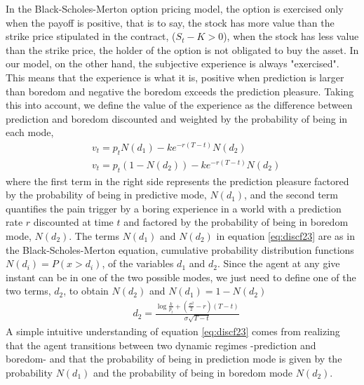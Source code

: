 \documentclass[11pt, onecolumn]{article}
\begin{document}
In the Black-Scholes-Merton option pricing model, the option is exercised only when the payoff is positive, that is to say, the stock  has more value than the strike price stipulated in the contract, ($S_t - K >0 $), when the stock has less value than the strike price, the holder of the option is not obligated to buy the asset. In our model, on the other hand, the subjective experience is always "exercised". This means that the experience is what it is, positive when prediction is larger than boredom and negative the boredom exceeds the prediction pleasure. Taking this into account, we define the value of the experience as the difference between prediction and boredom discounted and weighted by the probability of being in each mode,
\begin{equation}
\begin{split}
   &  v_t  =  p_{t}N(d_1) - k e^{-r(T-t)}N(d_2) \\ 
   &  v_t  =  p_{t}(1 - N(d_2)) - k e^{-r(T-t)}N(d_2) 
\end{split}
\label{eq:discf23}
\end{equation}
where the first term in the right side represents the prediction pleasure  factored by the probability of being in predictive mode, $N(d_1)$, and the second term quantifies the pain trigger by a boring experience in a world with a prediction rate $r$ discounted at time $t$ and factored by the probability of being in boredom mode, $N(d_2)$. The terms $N(d_1)$ and $N(d_2)$ in equation \ref{eq:discf23} are as in the Black-Scholes-Merton equation, cumulative probability distribution functions $N(d_i) = P(x > d_i)$, of the variables $d_1$ and $d_2$. Since the agent at any give instant can be in one of the two possible modes, we just need to define one of the two terms, $d_2$, to obtain $N(d_2)$ and $N(d_1) = 1 - N(d_2)$
\begin{equation}
\begin{split}
    & d_2 = \frac{\log \frac{k}{p_t}  + (\frac{\sigma ^2}{2} - r)(T-t)}{\sigma \sqrt{T-t}} 
\end{split}
\label{eq:discd1d2}
\end{equation}
A simple intuitive understanding of equation \ref{eq:discf23} comes from realizing that the agent transitions between two dynamic regimes -prediction and boredom- and that the probability of being in prediction mode is given by the probability $N(d_1)$ and the probability of being in boredom mode $N(d_2)$. 
\end{document}
